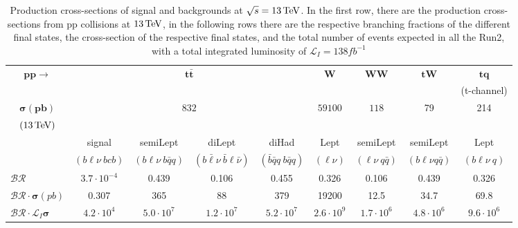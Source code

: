 \begin{table}[H]
    \centering
    \fontsize{9.2pt}{9.2pt}\selectfont
    \begin{tabular}{l|cccc|c|c|c|c}
        \toprule
          \multicolumn{1}{c|}{$\mathbf{pp\to}$}&\multicolumn{4}{c|}{$ \mathbf{t\bar{t}}$}&  $ \mathbf{W}$& $ \mathbf{WW}$ & $ \mathbf{tW}$& $ \mathbf{tq}$\\
          &&  &  &  &  &   & & (t-channel)\\
          \midrule
          \multicolumn{1}{c|}{$\mathbf{\sigma (pb)}$}&\multicolumn{4}{c|}{\multirow{2}{*}{$832$}}& \multirow{2}{*}{$59100$} & \multirow{2}{*}{$118$} &  \multirow{2}{*}{79}& \multirow{2}{*}{214} \\
          \multicolumn{1}{c|}{$(13{\,\text{Te\hspace{-.08em}V}})$}& &  & & &  &&&\\
          \midrule
          &signal&  semiLept&  diLept&  diHad& Lept &  semiLept & semiLept& Lept\\
          &$(b\ell \nu\: bcb)$&$(b\ell \nu\: b\bar{q}q)$&$(b\bar{\ell} \nu\: \bar{b}\ell \bar{\nu})$&$(\bar{b}\bar{q}q\: b\bar{q}q)$&$(\ell \nu)$&$(\ell \nu \: q\bar{q})$& $(b\ell\nu q \bar{q})$&$(b\ell\nu \: q)$\\
          \midrule
          $\mathcal{BR}$& $3.7 \cdot 10^{-4}$   & 0.439 & 0.106 & 0.455 & 0.326 & 0.106 & 0.439 & 0.326\\
          $ \mathcal{BR}\cdot\mathbf{\sigma} (pb)$& 0.307 & 365 & 88 & 379 & 19200 & 12.5 & 34.7& 69.8 \\
          $\mathcal{BR}\cdot\mathcal{L}_I\mathbf{\sigma} $&$4.2 \cdot 10^4$& $5.0 \cdot 10^7$ &  $1.2 \cdot 10^7$&$5.2 \cdot 10^7$  &  $2.6 \cdot 10^9$ & $1.7 \cdot 10^6$  & $4.8 \cdot 10^6$& $9.6 \cdot 10^{6}$\\
          \bottomrule
    \end{tabular}
    \vspace{0.2cm}
    \caption{Production cross-sections of signal and backgrounds at $\sqrt{s}=13{\,\text{Te\hspace{-.08em}V}}$. In the first row, there are the production cross-sections from pp collisions at $13 {\,\text{Te\hspace{-.08em}V}}$, in the following rows there are the respective branching fractions of the different final states, the cross-section of the respective final states, and the total number of events expected in all the Run2, with a total integrated luminosity of $\mathcal{L}_I=138 {fb}^{-1}$}
    \label{tab:cross}
\end{table}

